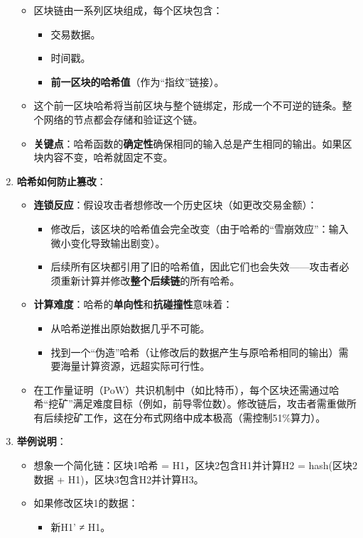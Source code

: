 \documentclass[a4paper,12pt]{ctexart}
\begin{document}
\begin{enumerate}
\begin{itemize}
\item 区块链由一系列区块组成，每个区块包含：
\begin{itemize}
\item 交易数据。
\item 时间戳。
\item \textbf{前一区块的哈希值}（作为“指纹”链接）。
\end{itemize}
\item 这个前一区块哈希将当前区块与整个链绑定，形成一个不可逆的链条。整个网络的节点都会存储和验证这个链。
\item \textbf{关键点}：哈希函数的\textbf{确定性}确保相同的输入总是产生相同的输出。如果区块内容不变，哈希就固定不变。
\end{itemize}
\item \textbf{哈希如何防止篡改}：
\begin{itemize}
\item \textbf{连锁反应}：假设攻击者想修改一个历史区块（如更改交易金额）：
\begin{itemize}
\item 修改后，该区块的哈希值会完全改变（由于哈希的“雪崩效应”：输入微小变化导致输出剧变）。
\item 后续所有区块都引用了旧的哈希值，因此它们也会失效——攻击者必须重新计算并修改\textbf{整个后续链}的所有哈希。
\end{itemize}
\item \textbf{计算难度}：哈希的\textbf{单向性}和\textbf{抗碰撞性}意味着：
\begin{itemize}
\item 从哈希逆推出原始数据几乎不可能。
\item 找到一个“伪造”哈希（让修改后的数据产生与原哈希相同的输出）需要海量计算资源，远超实际可行性。
\end{itemize}
\item 在工作量证明（PoW）共识机制中（如比特币），每个区块还需通过哈希“挖矿”满足难度目标（例如，前导零位数）。修改链后，攻击者需重做所有后续挖矿工作，这在分布式网络中成本极高（需控制51\%算力）。
\end{itemize}
\item \textbf{举例说明}：
\begin{itemize}
\item 想象一个简化链：区块1哈希 = H1，区块2包含H1并计算H2 = hash(区块2数据 + H1)，区块3包含H2并计算H3。
\item 如果修改区块1的数据：
\begin{itemize}
\item 新H1' ≠ H1。

\end{itemize}
\end{itemize}
\end{enumerate}
\end{document}
